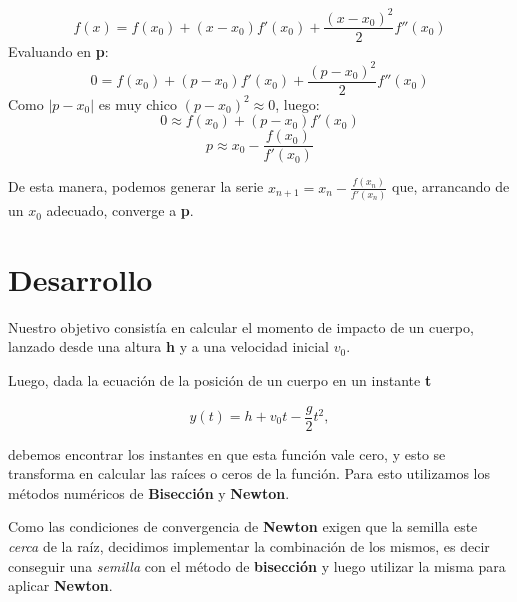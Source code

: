 \documentclass[a4paper]{article}
\begin{document}
$$f(x) = f(x_0) + (x - x_0)f'(x_0) + \frac{(x - x_0)^2}{2}f''(x_0)$$
Evaluando en \textbf{p}:
$$0 = f(x_0) + (p - x_0)f'(x_0) + \frac{(p - x_0)^2}{2}f''(x_0)$$
Como  $|p - x_0|$ es muy chico $(p - x_0)^2 \approx 0$, luego:  
$$0 \approx f(x_0) + (p - x_0)f'(x_0)$$
$$p \approx x_0 - \frac{f(x_0)}{f'(x_0)}$$

De esta manera, podemos generar la serie $x_{n + 1} = x_n - \frac{f(x_n)}{f'(x_n)}$ que, arrancando de un $x_0$ adecuado, converge a \textbf{p}.

\newpage

\section{Desarrollo}

Nuestro objetivo consistía en calcular el momento de impacto de un cuerpo, lanzado desde una altura \textbf{h} y a una velocidad inicial \textbf{$v_0$}. 

Luego, dada la ecuación de la posición de un cuerpo en un instante \textbf{t}

\begin{equation}
 y(t) = h + v_0 t - \frac{g}{2} t^2,
\end{equation}

debemos encontrar los instantes en que esta función vale cero, y esto se transforma en calcular las raíces o ceros de la función. Para esto utilizamos los métodos numéricos de \textbf{Bisección} y \textbf{Newton}.

Como las condiciones de convergencia de \textbf{Newton} exigen que la semilla este \textit{cerca} de la raíz, decidimos implementar la combinación de los mismos, es decir conseguir una \textit{semilla} con el método de \textbf{bisección} y luego utilizar la misma para aplicar \textbf{Newton}. \\ \hspace{1em}
\end{document}
